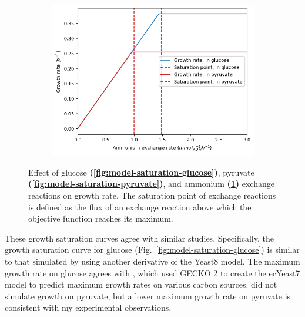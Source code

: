 \begin{figure}[hbp!]
  \begin{subfigure}[t]{0.45\textwidth}
  \centering
    \includegraphics[width=\linewidth]{saturation_amm}
    \caption{
    }
    \label{fig:model-saturation-ammonium}
  \end{subfigure}

  \caption[
    Effect of exchange reactions on growth rate
  ]{
    Effect of glucose \textbf{(\ref{fig:model-saturation-glucose})}, pyruvate \textbf{(\ref{fig:model-saturation-pyruvate})}, and ammonium \textbf{(\ref{fig:model-saturation-ammonium})} exchange reactions on growth rate.
    The saturation point of exchange reactions is defined as the flux of an exchange reaction above which the objective function reaches its maximum.
  }
  \label{fig:model-saturation}
\end{figure}

These growth saturation curves agree with similar studies.
Specifically, the growth saturation curve for glucose (Fig.\ \ref{fig:model-saturation-glucose}) is similar to that simulated by \textcite{elsemmanWholecellModelingYeast2022} using another derivative of the Yeast8 model.
The maximum growth rate on glucose agrees with \textcite{domenzainReconstructionCatalogueGenomescale2022}, which used GECKO 2 to create the ecYeast7 model to predict maximum growth rates on various carbon sources.
\textcite{domenzainReconstructionCatalogueGenomescale2022} did not simulate growth on pyruvate, but a lower maximum growth rate on pyruvate is consistent with my experimental observations.


